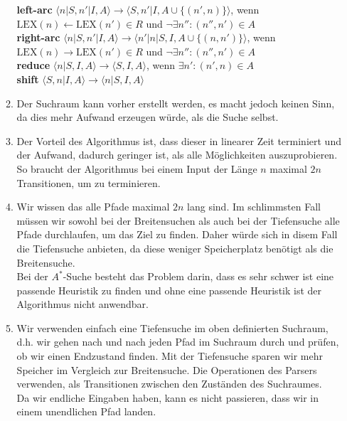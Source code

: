 \documentclass[a4paper]{scrartcl}
\begin{document}
\begin{enumerate}
\begin{enumerate}
                \textbf{left-arc}   $\langle n|S,n'|I,A\rangle \rightarrow \langle S,n'|I,A \cup \{(n',n)\}\rangle$, wenn $\mathrm{LEX}(n) \leftarrow \mathrm{LEX}(n') \in R$ und $\lnot \exists n'' : (n'', n') \in A$ \\
        \textbf{right-arc} $\langle n |S, n' | I, A \rangle \rightarrow \langle n'|n|S, I, A \cup \{(n, n')\}\rangle$, wenn $\mathrm{LEX}(n) \rightarrow \mathrm{LEX}(n') \in R$ und $\lnot \exists n'' : (n'', n') \in A$ \\
            \textbf{reduce} $\langle n|S,I,A\rangle \rightarrow \langle S,I,A \rangle$, wenn $\exists n' : (n', n) \in A$ \\
	            \textbf{shift} $\langle S,n|I,A\rangle \rightarrow \langle n|S,I,A \rangle$ \\
				
			\item
				Der Suchraum kann vorher erstellt werden, es macht jedoch keinen Sinn, da dies
				mehr Aufwand erzeugen würde, als die Suche selbst. \\
				
			\item
				Der Vorteil des Algorithmus ist, dass dieser in linearer Zeit terminiert und der
				Aufwand, dadurch geringer ist, als alle Möglichkeiten auszuprobieren. So braucht der 
				Algorithmus bei einem Input der Länge $n$ maximal $2n$ Transitionen, um zu terminieren.
				
			\item
				Wir wissen das alle Pfade maximal $2n$ lang sind. Im schlimmsten Fall müssen wir 
				sowohl bei der Breitensuchen als auch bei der Tiefensuche alle Pfade durchlaufen, um
				das Ziel zu finden. Daher würde sich in disem Fall die Tiefensuche anbieten, da diese
				weniger Speicherplatz benötigt als die Breitensuche. \\
				Bei der $A^*$-Suche besteht das Problem darin, dass es sehr schwer ist eine passende
				Heuristik zu finden und ohne eine passende Heuristik ist der Algorithmus nicht anwendbar.
				
			\item
				Wir verwenden einfach eine Tiefensuche im oben definierten Suchraum, d.h. wir gehen nach
				und nach jeden Pfad im Suchraum durch und prüfen, ob wir einen Endzustand finden. Mit
				der Tiefensuche sparen wir mehr Speicher im Vergleich zur Breitensuche. Die Operationen
				des Parsers verwenden, als Transitionen zwischen den Zuständen des Suchraumes. \\
				Da wir endliche Eingaben haben, kann es nicht passieren, dass wir in einem unendlichen
				Pfad landen. \\ 
				
				
				
				
		\end{enumerate}

\end{enumerate}
\end{document}
